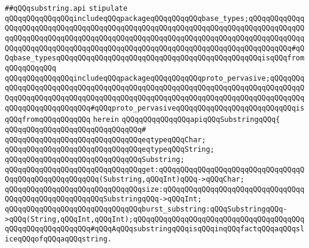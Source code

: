 \label{src/lib/core/init/substring.api}
\verb|##qQQqsubstring.api|\newline
\newline
\newline
\verb|stipulate|\newline
\verb|qQQqqQQqqQQqqQQqincludeqQQqpackageqQQqqQQqqQQqbase_types;qQQqqQQqqQQqqQQqqQQqqQQqqQQqqQQqqQQqqQQqqQQqqQQqqQQqqQQqqQQqqQQqqQQqqQQqqQQqqQQqqQQqqQQqqQQqqQQqqQQqqQQqqQQqqQQqqQQqqQQqqQQqqQQqqQQqqQQqqQQqqQQqqQQqqQQqqQQqqQQqqQQqqQQqqQQqqQQqqQQqqQQqqQQqqQQqqQQqqQQqqQQqqQQqqQQqqQQqqQQq#qQQqbase_typesqQQqqQQqqQQqqQQqqQQqqQQqqQQqqQQqqQQqqQQqqQQqqQQqisqQQqfromqQQqqQQqqQQq|\newline
\verb|qQQqqQQqqQQqqQQqincludeqQQqpackageqQQqqQQqqQQqproto_pervasive;qQQqqQQqqQQqqQQqqQQqqQQqqQQqqQQqqQQqqQQqqQQqqQQqqQQqqQQqqQQqqQQqqQQqqQQqqQQqqQQqqQQqqQQqqQQqqQQqqQQqqQQqqQQqqQQqqQQqqQQqqQQqqQQqqQQqqQQqqQQqqQQqqQQqqQQqqQQqqQQqqQQqqQQq#qQQqproto_pervasiveqQQqqQQqqQQqqQQqqQQqqQQqqQQqisqQQqfromqQQqqQQqqQQq|\newline
\verb|herein|\newline
\newline
\verb|qQQqqQQqqQQqqQQqapiqQQqSubstringqQQq{|\newline
\verb|qQQqqQQqqQQqqQQqqQQqqQQqqQQqqQQq#|\newline
\verb|qQQqqQQqqQQqqQQqqQQqqQQqqQQqqQQqeqtypeqQQqChar;|\newline
\verb|qQQqqQQqqQQqqQQqqQQqqQQqqQQqqQQqeqtypeqQQqString;|\newline
\newline
\verb|qQQqqQQqqQQqqQQqqQQqqQQqqQQqqQQqSubstring;|\newline
\newline
\newline
\verb|qQQqqQQqqQQqqQQqqQQqqQQqqQQqqQQqget:qQQqqQQqqQQqqQQqqQQqqQQqqQQqqQQqqQQqqQQqqQQqqQQqqQQqqQQq(Substring,qQQqInt)qQQq->qQQqChar;|\newline
\verb|qQQqqQQqqQQqqQQqqQQqqQQqqQQqqQQqsize:qQQqqQQqqQQqqQQqqQQqqQQqqQQqqQQqqQQqqQQqqQQqqQQqqQQqqQQqSubstringqQQq->qQQqInt;|\newline
\verb|qQQqqQQqqQQqqQQqqQQqqQQqqQQqqQQqburst_substring:qQQqSubstringqQQq->qQQq(String,qQQqInt,qQQqInt);qQQqqQQqqQQqqQQqqQQqqQQqqQQqqQQqqQQqqQQqqQQqqQQqqQQqqQQqqQQq#qQQqAqQQqsubstringqQQqisqQQqinqQQqfactqQQqaqQQqsliceqQQqofqQQqaqQQqstring.|\newline
